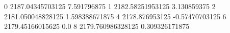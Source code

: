 0 2187.04345703125 7.591796875
1 2182.58251953125 3.130859375
2 2181.050048828125 1.598388671875
4 2178.876953125 -0.57470703125
6 2179.45166015625 0.0
8 2179.760986328125 0.309326171875

